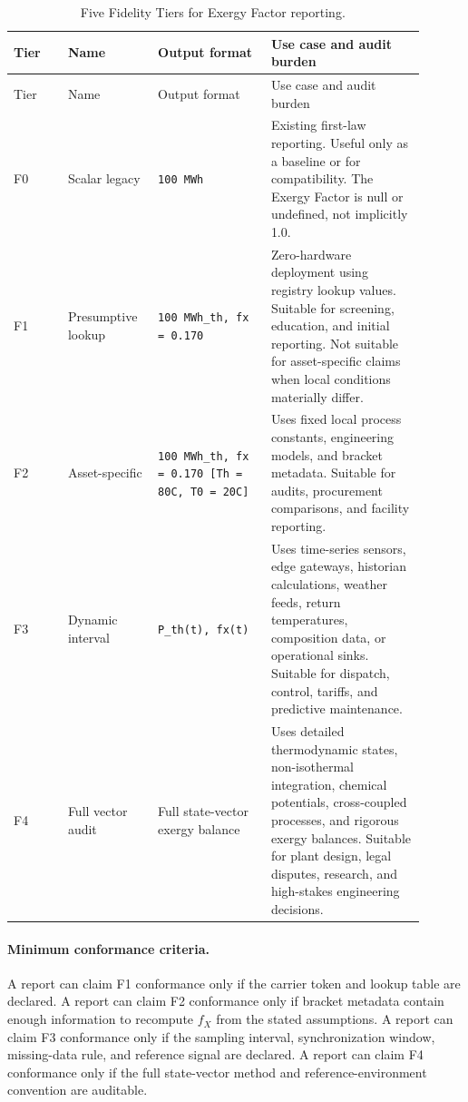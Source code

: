 \documentclass[11pt]{article}
\newcommand{\fx}{f_X}
\begin{document}
\begin{longtable}{@{}p{0.12\linewidth}p{0.19\linewidth}p{0.25\linewidth}p{0.34\linewidth}@{}}
\caption{Five Fidelity Tiers for Exergy Factor reporting.}\label{tab:fidelity}\\
\toprule
Tier & Name & Output format & Use case and audit burden \\
\midrule
\endfirsthead
\toprule
Tier & Name & Output format & Use case and audit burden \\
\midrule
\endhead
F0 & Scalar legacy & \texttt{100 MWh} & Existing first-law reporting. Useful only as a baseline or for compatibility. The Exergy Factor is null or undefined, not implicitly 1.0. \\
F1 & Presumptive lookup & \texttt{100 MWh\_th, fx = 0.170} & Zero-hardware deployment using registry lookup values. Suitable for screening, education, and initial reporting. Not suitable for asset-specific claims when local conditions materially differ. \\
F2 & Asset-specific & \texttt{100 MWh\_th, fx = 0.170 [Th = 80C, T0 = 20C]} & Uses fixed local process constants, engineering models, and bracket metadata. Suitable for audits, procurement comparisons, and facility reporting. \\
F3 & Dynamic interval & \texttt{P\_th(t), fx(t)} & Uses time-series sensors, edge gateways, historian calculations, weather feeds, return temperatures, composition data, or operational sinks. Suitable for dispatch, control, tariffs, and predictive maintenance. \\
F4 & Full vector audit & Full state-vector exergy balance & Uses detailed thermodynamic states, non-isothermal integration, chemical potentials, cross-coupled processes, and rigorous exergy balances. Suitable for plant design, legal disputes, research, and high-stakes engineering decisions. \\
\bottomrule
\end{longtable}


\paragraph{Minimum conformance criteria.} A report can claim F1 conformance only if the carrier token and lookup table are declared. A report can claim F2 conformance only if bracket metadata contain enough information to recompute $\fx$ from the stated assumptions. A report can claim F3 conformance only if the sampling interval, synchronization window, missing-data rule, and reference signal are declared. A report can claim F4 conformance only if the full state-vector method and reference-environment convention are auditable.
\end{document}
